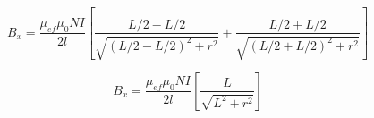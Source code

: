 \documentclass[a4paper,12pt]{article}
\begin{document}
    \begin{equation*}
        B_x = \frac{\mu_{ef}\mu_0 N I}{2l} \left[ \frac{L/2 - L/2}{\sqrt{(L/2 - L/2)^2 + r^2}} + \frac{L/2 + L/2}{\sqrt{(L/2 + L/2)^2 + r^2}} \right]
    \end{equation*}

    \begin{equation*}
        B_x = \frac{\mu_{ef}\mu_0 N I}{2l} \left[ \frac{L}{\sqrt{L^2 + r^2}} \right]
    \end{equation*}
\end{document}
